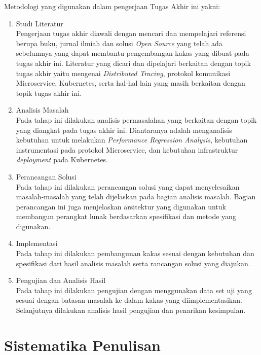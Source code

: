 Metodologi yang digunakan dalam pengerjaan Tugas Akhir ini yakni:
\begin{enumerate}
    \item Studi Literatur \\
          Pengerjaan tugas akhir diawali dengan mencari dan mempelajari referensi berupa buku, jurnal ilmiah dan solusi \textit{Open Source}  yang telah ada sebelumnya yang dapat membantu pengembangan kakas yang dibuat pada tugas akhir ini. Literatur yang dicari dan dipelajari berkaitan dengan topik tugas akhir yaitu mengenai \textit{Distributed Tracing},  protokol komunikasi Microservice, Kubernetes, serta hal-hal lain yang masih berkaitan dengan topik tugas akhir ini.

    \item Analisis Masalah \\
          Pada tahap ini dilakukan analisis permasalahan yang berkaitan dengan topik yang diangkat pada tugas akhir ini. Diantaranya adalah menganalisis kebutuhan untuk melakukan \textit{Performance Regression Analysis}, kebutuhan instrumentasi pada protokol Microservice, dan kebutuhan infrastruktur \textit{deployment} pada Kubernetes.

    \item Perancangan Solusi \\
          Pada tahap ini dilakukan perancangan solusi yang dapat menyelesaikan masalah-masalah yang telah dijelaskan pada bagian analisis masalah. Bagian perancangan ini juga menjelaskan arsitektur yang digunakan untuk membangun perangkat lunak berdasarkan spesifikasi dan metode yang digunakan.

    \item Implementasi \\
          Pada tahap ini dilakukan pembangunan kakas sesuai dengan kebutuhan dan spesifikasi dari hasil analisis masalah serta rancangan solusi yang diajukan.

    \item Pengujian dan Analisis Hasil \\
          Pada tahap ini dilakukan pengujian dengan menggunakan data set uji yang sesuai dengan batasan masalah ke dalam kakas yang diimplementasikan. Selanjutnya dilakukan analisis hasil pengujian dan penarikan kesimpulan.

\end{enumerate}

\section{Sistematika Penulisan}


